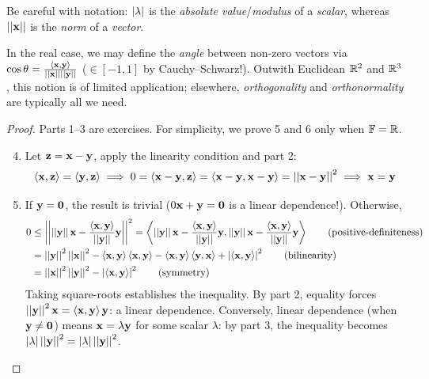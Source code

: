 Be careful with notation: $\nm\lambda$ is the \emph{absolute value}/\emph{modulus} of a \emph{scalar}, whereas $\Nm{\vx}$ is the \emph{norm} of a \emph{vector}.\medbreak


	In the real case, we may define the \emph{angle} between non-zero vectors via $\cos\theta=\frac{\ip{\vx,\vy}}{\Nm\vx\Nm\vy}$  ($\in[-1,1]$ by Cauchy--Schwarz!). Outwith Euclidean $\R^2$ and $\R^3$, this notion is of limited application; elsewhere, \emph{orthogonality} and \emph{orthonormality} are typically all we need.


\begin{proof}
	Parts 1--3 are exercises. For simplicity, we prove 5 and 6 only when $\F=\R$.
	\begin{enumerate}\setcounter{enumi}{3}
	  \item Let $\vz=\vx-\vy$, apply the linearity condition and part 2:
	  \[
	  	\ip{\vx,\vz}=\ip{\vy,\vz}
	  	\implies 0=\ip{\vx-\vy,\vz}=\ip{\vx-\vy,\vx-\vy}=\Nm{\vx-\vy}^2
	  	\implies \vx=\vy
	  \]
	  
	  \item If $\vy=\V0$, the result is trivial ($0\vx+\vy=\V0$ is a linear dependence!). Otherwise,
	  \begin{align*}
		  0&\le\Nm{\Nm{\vy}\vx-\frac{\ip{\vx,\vy}}{\Nm{\vy}}\vy}^2 =\ip{\Nm{\vy}\vx-\frac{\ip{\vx,\vy}}{\Nm{\vy}}\vy,\Nm{\vy}\vx-\frac{\ip{\vx,\vy}}{\Nm{\vy}}\vy}\tag{positive-definiteness}\\
		  &=\Nm{\vy}^2\Nm\vx^2 -\ip{\vx,\vy}\ip{\vx,\vy} -\ip{\vx,\vy}\ip{\vy,\vx}  +\nm{\ip{\vx,\vy}}^2 \tag{bilinearity}\\
		  &=\Nm\vx^2\Nm{\vy}^2-\nm{\ip{\vx,\vy}}^2\tag{symmetry}
	  \end{align*}
	  Taking square-roots establishes the inequality. By part 2, equality forces $\Nm{\vy}^2\vx=\ip{\vx,\vy}\vy$: a linear dependence. Conversely, linear dependence (when $\vy\neq \V0$) means $\vx=\lambda\vy$ for some scalar $\lambda$: by part 3, the inequality becomes $\nm\lambda\Nm{\vy}^2=\nm\lambda\Nm{\vy}^2$.
	  

\end{enumerate}
\end{proof}
